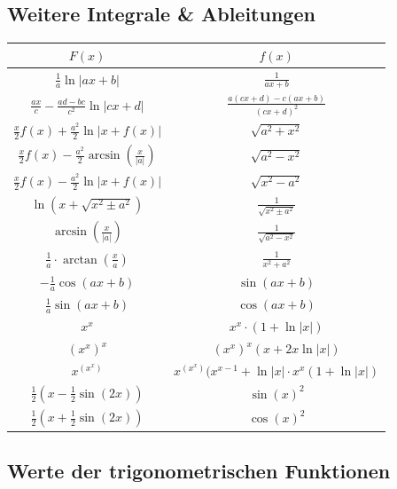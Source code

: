 \newpage

\subsection{Weitere Integrale \& Ableitungen}
\begin{center}
    \begin{tabular}{c||c}

        $F(x)$ & $f(x)$\\
        \hline
        \hline
        $\frac{1}{a}\ln|ax+b|$ & $\frac{1}{ax+b}$ \\
        $\frac{ax}{c}-\frac{ad-bc}{c^2}\ln|cx+d|$ & $\frac{a(cx+d) - c(ax+b)}{(cx+d)^2}$\\
        $\frac{x}{2}f(x)+\frac{a^2}{2}\ln|x+f(x)|$ & $\sqrt{a^2+x^2}$ \\
        $\frac{x}{2}f(x)-\frac{a^2}{2}\arcsin(\frac{x}{|a|})$ & $\sqrt{a^2-x^2}$ \\
        $\frac{x}{2}f(x) - \frac{a^2}{2}\ln|x + f(x)|$ & $\sqrt{x^2-a^2}$\\
        $\ln(x + \sqrt{x^2 \pm a^2})$ & $\frac{1}{\sqrt{x^2 \pm a^2}}$\\
        $\arcsin(\frac{x}{|a|})$ & $\frac{1}{\sqrt{a^2-x^2}}$ \\
        $\frac{1}{a} \cdot\arctan(\frac{x}{a})$ & $\frac{1}{x^2+a^2}$\\
        \hline
        $-\frac{1}{a}\cos(ax+b)$ & $\sin(ax+b)$ \\
        $\frac{1}{a}\sin(ax+b)$ & $\cos(ax+b)$ \\
        \hline
        $x^x$ & $x^x \cdot (1 + \ln|x|)$\\
        $(x^x)^x$ & $(x^x)^x(x+2x\ln|x|)$\\
        $x^{(x^x)}$ & $x^{(x^x)}(x^{x-1}+\ln|x|\cdot x^x(1+\ln|x|)$\\
        \hline
        $\frac{1}{2}(x-\frac{1}{2}\sin(2x))$ & $\sin(x)^2$\\
        $\frac{1}{2}(x+\frac{1}{2}\sin(2x))$ & $\cos(x)^2$\\
    \end{tabular}
\end{center}

\subsection{Werte der trigonometrischen Funktionen}

